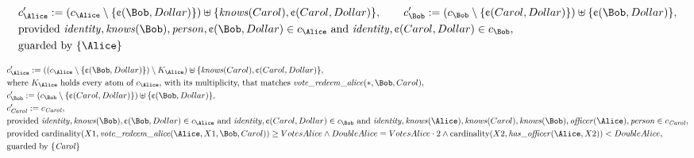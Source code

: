\begin{align*}
&
c'_
{
\Alice
}
 := 
(c_
{
\Alice
}
 \setminus 
\{
\text{\textcent}
(
\Bob
,
Dollar
)
\}
) \uplus 
\{
\mathit{\detokenize{
knows
}}
(
Carol
)
,
\text{\textcent}
(
Carol
,
Dollar
)
\}
, \qquad 
c'_
{
\Bob
}
 := 
(c_
{
\Bob
}
 \setminus 
\{
\text{\textcent}
(
Carol
,
Dollar
)
\}
) \uplus 
\{
\text{\textcent}
(
\Bob
,
Dollar
)
\}
,\\
&
\text{provided } 
\mathit{\detokenize{
identity
}}
,
\mathit{\detokenize{
knows
}}
(
\Bob
)
,
\mathit{\detokenize{
person
}}
,
\text{\textcent}
(
\Bob
,
Dollar
)
 \in c_
{
\Alice
}
 \text{ and } 
\mathit{\detokenize{
identity
}}
,
\text{\textcent}
(
Carol
,
Dollar
)
 \in c_
{
\Bob
}
,\\
&
\text{guarded by } \{
\Alice
\}
\end{align*}

\begin{align*}
&
c'_
{
\Alice
}
 := 
(
(c_
{
\Alice
}
 \setminus 
\{
\text{\textcent}
(
\Bob
,
Dollar
)
\}
) \setminus K_
{
\Alice
}
) \uplus 
\{
\mathit{\detokenize{
knows
}}
(
Carol
)
,
\text{\textcent}
(
Carol
,
Dollar
)
\}
,\\
&
\text{where } K_
{
\Alice
}
 \text{ holds every atom of } c_
{
\Alice
}
 \text{, with its multiplicity, that matches } 
\mathit{\detokenize{
vote_redeem_alice
}}
(
\ast
,
\Bob
,
Carol
)
,\\
&
c'_
{
\Bob
}
 := 
(c_
{
\Bob
}
 \setminus 
\{
\text{\textcent}
(
Carol
,
Dollar
)
\}
) \uplus 
\{
\text{\textcent}
(
\Bob
,
Dollar
)
\}
,\\
&
c'_
{
\mathit{Carol}
}
 := 
c_
{
\mathit{Carol}
}
,\\
&
\text{provided } 
\mathit{\detokenize{
identity
}}
,
\mathit{\detokenize{
knows
}}
(
\Bob
)
,
\text{\textcent}
(
\Bob
,
Dollar
)
 \in c_
{
\Alice
}
 \text{ and } 
\mathit{\detokenize{
identity
}}
,
\text{\textcent}
(
Carol
,
Dollar
)
 \in c_
{
\Bob
}
 \text{ and } 
\mathit{\detokenize{
identity
}}
,
\mathit{\detokenize{
knows
}}
(
\Alice
)
,
\mathit{\detokenize{
knows
}}
(
Carol
)
,
\mathit{\detokenize{
knows
}}
(
\Bob
)
,
\mathit{\detokenize{
officer
}}
(
\Alice
)
,
\mathit{\detokenize{
person
}}
 \in c_
{
\mathit{Carol}
}
,\\
&
\text{provided } 
\mathrm{cardinality}(
X1
,
\mathit{\detokenize{
vote_redeem_alice
}}
(
\Alice
,
X1
,
\Bob
,
Carol
)
)
\ge
VotesAlice
\land
DoubleAlice
=
VotesAlice
\cdot
2
\land
\mathrm{cardinality}(
X2
,
\mathit{\detokenize{
has_officer
}}
(
\Alice
,
X2
)
)
<
DoubleAlice
,\\
&
\text{guarded by } \{
\mathit{Carol}
\}
\end{align*}
